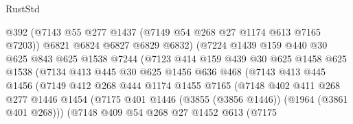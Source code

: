\begin{lexlean}{RustStd}
\begin{coremodule}
                            @392
                            (@7143 @55 @277 @1437 (@7149 @54 @268 @27 @1174 @613 @7165 @7203))
                            @6821
                            @6824
                            @6827
                            @6829
                            @6832)
                          (@7224
                            @1439
                            @159
                            @440
                            @30
                            @625
                            @843
                            @625
                            @1538
                            @7244
                            (@7123
                              @414
                              @159
                              @439
                              @30
                              @625
                              @1458
                              @625
                              @1538
                              (@7134
                                @413
                                @445
                                @30
                                @625
                                @1456
                                @636
                                @468
                                (@7143
                                  @413
                                  @445
                                  @1456
                                  (@7149
                                    @412
                                    @268
                                    @444
                                    @1174
                                    @1455
                                    @7165
                                    (@7148
                                      @402
                                      @411
                                      @268
                                      @277
                                      @1446
                                      @1454
                                      (@7175
                                        @401
                                        @1446
                                        (@3855 (@3856 @1446))
                                        (@1964 (@3861 @401 @268)))
                                      (@7148
                                        @409
                                        @54
                                        @268
                                        @27
                                        @1452
                                        @613
                                        (@7175

\end{coremodule}
\end{lexlean}
